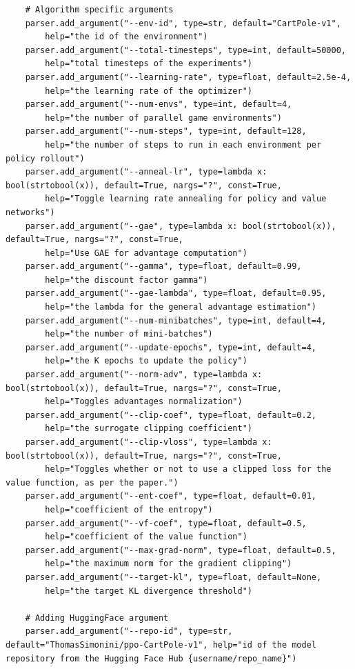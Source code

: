 \documentclass[11pt,a4paper]{article}
\begin{document}
\begin{lstlisting}
    # Algorithm specific arguments
    parser.add_argument("--env-id", type=str, default="CartPole-v1",
        help="the id of the environment")
    parser.add_argument("--total-timesteps", type=int, default=50000,
        help="total timesteps of the experiments")
    parser.add_argument("--learning-rate", type=float, default=2.5e-4,
        help="the learning rate of the optimizer")
    parser.add_argument("--num-envs", type=int, default=4,
        help="the number of parallel game environments")
    parser.add_argument("--num-steps", type=int, default=128,
        help="the number of steps to run in each environment per policy rollout")
    parser.add_argument("--anneal-lr", type=lambda x: bool(strtobool(x)), default=True, nargs="?", const=True,
        help="Toggle learning rate annealing for policy and value networks")
    parser.add_argument("--gae", type=lambda x: bool(strtobool(x)), default=True, nargs="?", const=True,
        help="Use GAE for advantage computation")
    parser.add_argument("--gamma", type=float, default=0.99,
        help="the discount factor gamma")
    parser.add_argument("--gae-lambda", type=float, default=0.95,
        help="the lambda for the general advantage estimation")
    parser.add_argument("--num-minibatches", type=int, default=4,
        help="the number of mini-batches")
    parser.add_argument("--update-epochs", type=int, default=4,
        help="the K epochs to update the policy")
    parser.add_argument("--norm-adv", type=lambda x: bool(strtobool(x)), default=True, nargs="?", const=True,
        help="Toggles advantages normalization")
    parser.add_argument("--clip-coef", type=float, default=0.2,
        help="the surrogate clipping coefficient")
    parser.add_argument("--clip-vloss", type=lambda x: bool(strtobool(x)), default=True, nargs="?", const=True,
        help="Toggles whether or not to use a clipped loss for the value function, as per the paper.")
    parser.add_argument("--ent-coef", type=float, default=0.01,
        help="coefficient of the entropy")
    parser.add_argument("--vf-coef", type=float, default=0.5,
        help="coefficient of the value function")
    parser.add_argument("--max-grad-norm", type=float, default=0.5,
        help="the maximum norm for the gradient clipping")
    parser.add_argument("--target-kl", type=float, default=None,
        help="the target KL divergence threshold")

    # Adding HuggingFace argument
    parser.add_argument("--repo-id", type=str, default="ThomasSimonini/ppo-CartPole-v1", help="id of the model repository from the Hugging Face Hub {username/repo_name}")


\end{lstlisting}
\end{document}
